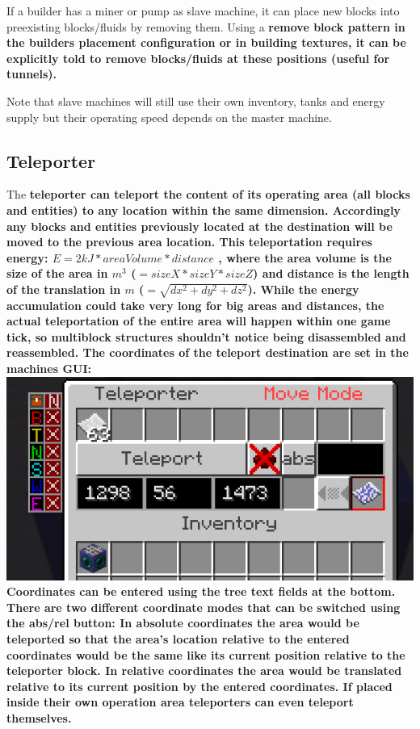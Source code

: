 \documentclass[11pt]{article} %
\begin{document}
If a builder has a miner or pump as slave machine, it can place new blocks into preexisting blocks/fluids by removing them. Using a \bf remove block pattern \rm in the builders placement configuration or in building textures, it can be explicitly told to remove blocks/fluids at these positions (useful for tunnels).

Note that slave machines will still use their own inventory, tanks and energy supply but their operating speed depends on the master machine.

\subsection{Teleporter}
The \bf teleporter \rm can teleport the content of its operating area (all blocks and entities) to any location within the same dimension. Accordingly any blocks and entities previously located at the destination will be moved to the previous area location. This teleportation requires energy: $E = 2kJ * areaVolume * distance$ , where the area volume is the size of the area in $m^3$ (${=sizeX * sizeY * sizeZ}$) and distance is the length of the translation in $m$ (${=\sqrt{dx^2 + dy^2 + dz^2}}$). While the energy accumulation could take very long for big areas and distances, the actual teleportation of the entire area will happen within one game tick, so multiblock structures shouldn't notice being disassembled and reassembled. The coordinates of the teleport destination are set in the machines GUI: \\
\includegraphics[width = \textwidth]{teleporter} \\
Coordinates can be entered using the tree text fields at the bottom. There are two different coordinate modes that can be switched using the abs/rel button: In absolute coordinates the area would be teleported so that the area's location relative to the entered coordinates would be the same like its current position relative to the teleporter block. In relative coordinates the area would be translated relative to its current position by the entered coordinates.  If placed inside their own operation area teleporters can even teleport themselves.
\end{document}
